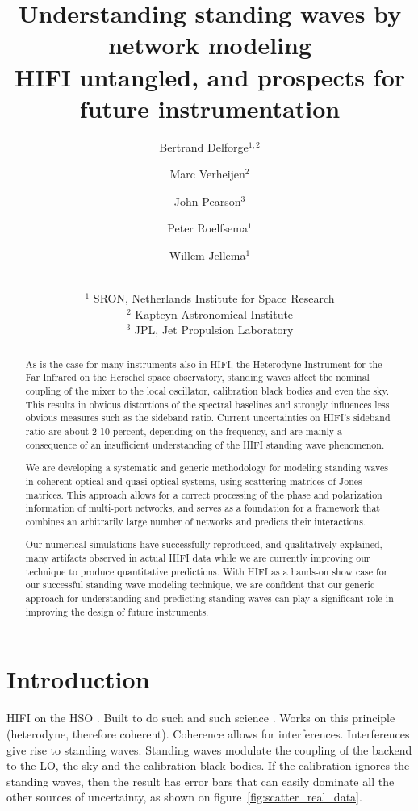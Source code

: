 \documentclass[a4paper,11pt]{article}
\title{Understanding standing waves by network modeling
\\
HIFI untangled, and prospects for future instrumentation}
\author{Bertrand Delforge$^{1, 2}$
       \and
       Marc Verheijen$^2$
       \and
       John Pearson$^3$
       \and
       Peter Roelfsema$^1$
       \and
       Willem Jellema$^1$
       \and
       \\ \footnotesize $^1$ SRON, Netherlands Institute for Space Research
       \\ \footnotesize $^2$ Kapteyn Astronomical Institute
       \\ \footnotesize $^3$ JPL, Jet Propulsion Laboratory
}
\begin{document}
\maketitle

\begin{abstract}
As is the case for many instruments also in HIFI, the Heterodyne Instrument for the Far Infrared on the Herschel space observatory, standing waves affect the nominal coupling of the mixer to the local oscillator, calibration black bodies and even the sky.  This results in obvious distortions of the spectral baselines and strongly influences less obvious measures such as the sideband ratio.  Current uncertainties on HIFI's sideband ratio are about 2-10 percent, depending on the frequency, and are mainly a consequence of an insufficient understanding of the HIFI standing wave phenomenon.

We are developing a systematic and generic methodology for modeling standing waves in coherent optical and quasi-optical systems, using scattering matrices of Jones matrices.  This approach allows for a correct processing of the phase and polarization information of multi-port networks, and serves as a foundation for a framework that combines an arbitrarily large number of networks and predicts their interactions.

Our numerical simulations have successfully reproduced, and qualitatively explained, many artifacts observed in actual HIFI data while we are currently improving our technique to produce quantitative predictions.  With HIFI as a hands-on show case for our successful standing wave modeling technique, we are confident that our generic approach for understanding and predicting standing waves can play a significant role in improving the design of future instruments.
\end{abstract}






\section{Introduction}
HIFI \cite{AA_518_L6} on the HSO \cite{AA_518_L1}.
Built to do such and such science \cite{AA_518_L6}.
Works on this principle (heterodyne, therefore coherent).
Coherence allows for interferences.
Interferences give rise to standing waves.
Standing waves modulate the coupling of the backend to the LO, the sky and the calibration black bodies.
If the calibration ignores the standing waves, then the result has error bars that can easily dominate all the other sources of uncertainty, as shown on figure~\ref{fig:scatter_real_data}.
\end{document}
